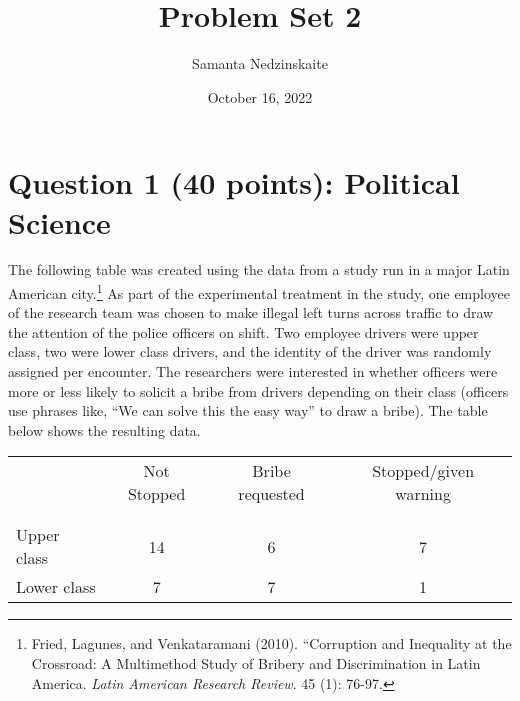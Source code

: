 \documentclass[12pt,letterpaper]{article}
\title{Problem Set 2}
\date{October 16, 2022}
\author{Samanta Nedzinskaite}
\begin{document}
		\maketitle

	\vspace{.5cm}
	\section*{Question 1 (40 points): Political Science}
		\vspace{.25cm}
	The following table was created using the data from a study run in a major Latin American city.\footnote{Fried, Lagunes, and Venkataramani (2010). ``Corruption and Inequality at the Crossroad: A Multimethod Study of Bribery and Discrimination in Latin America. \textit{Latin American Research Review}. 45 (1): 76-97.} As part of the experimental treatment in the study, one employee of the research team was chosen to make illegal left turns across traffic to draw the attention of the police officers on shift. Two employee drivers were upper class, two were lower class drivers, and the identity of the driver was randomly assigned per encounter. The researchers were interested in whether officers were more or less likely to solicit a bribe from drivers depending on their class (officers use phrases like, ``We can solve this the easy way'' to draw a bribe). The table below shows the resulting data.
\vspace{1.5cm}
\begin{table}[h!]
	\centering
	\begin{tabular}{l | c c c }
		& Not Stopped & Bribe requested & Stopped/given warning \\
		\\[-1.8ex] 
		\hline \\[-1.8ex]
		Upper class & 14 & 6 & 7 \\
		Lower class & 7 & 7 & 1 \\
		\hline
	\end{tabular}
\end{table}
\newpage
\end{document}
